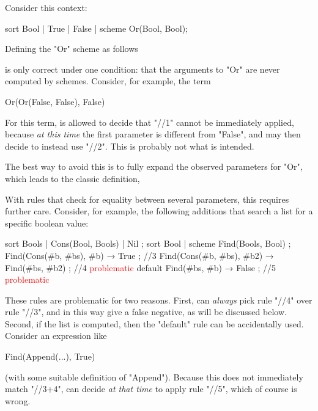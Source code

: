 \documentclass[11pt]{article} %
\begin{document}
Consider this context:
\begin{hacs}[xleftmargin=\parindent]
sort Bool | True | False | scheme Or(Bool, Bool);
\end{hacs}
Defining the "Or" scheme as follows
is only correct under one condition: that the arguments to "Or" are never computed by
schemes. Consider, for example, the term
\begin{hacs}[xleftmargin=\parindent]
Or(Or(False, False), False)
\end{hacs}
For this term, \HAX is allowed to decide that "//1" cannot be immediately applied, because \emph{at
  this time} the first parameter is different from "False", and \HAX may then decide to instead use
"//2". This is probably not what is intended.

The best way to avoid this is to fully expand the observed parameters for "Or", which leads to the
classic definition,
With rules that check for equality between several parameters, this requires further care. Consider,
for example, the following additions that search a list for a specific boolean value:
\begin{hacs}[texcl,xleftmargin=\parindent]
sort Bools | Cons(Bool, Bools) | Nil ;
sort Bool | scheme Find(Bools, Bool) ;
Find(Cons(#b, #bs), #b) → True ;                      //3
Find(Cons(#b, #bs), #b2) → Find(#bs, #b2) ;          //4 \textcolor{red}{problematic}
default Find(#bs, #b) → False ;                        //5 \textcolor{red}{problematic}
\end{hacs}
These rules are problematic for two reasons. First, \HAX can \emph{always} pick rule "//4" over rule
"//3", and in this way give a false negative, as will be discussed below. Second, if the list is
computed, then the "default" rule can be accidentally used. Consider an expression like
\begin{hacs}[xleftmargin=\parindent]
Find(Append(...), True)
\end{hacs}
(with some suitable definition of "Append"). Because this does not immediately match "//3+4", \HAX
can decide \emph{at that time} to apply rule "//5", which of course is wrong.
\end{document}
